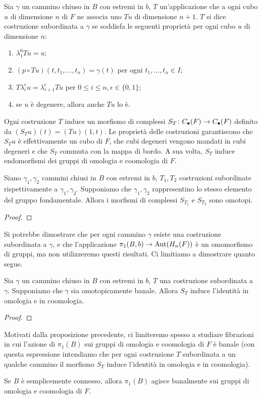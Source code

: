 \begin{definition}
Sia $\gamma$ un cammino chiuso in $B$ con estremi in $b$, $T$ un'applicazione che a ogni cubo $u$ di dimensione $n$ di $F$ ne associa uno $Tu$ di dimensione $n+1$. $T$ si dice costruzione subordinata a $\gamma$ se soddisfa le seguenti proprietà per ogni cubo $u$ di dimensione $n$:
\begin{enumerate}
\item $\lambda^0_1 Tu=u$;
\item $(p\circ Tu)(t,t_1,\ldots,t_n)=\gamma(t)$ per ogni $t_1,\ldots,t_n\in I$;
\item $T\lambda^\epsilon_iu=\lambda^\epsilon_{i+1}Tu$ per $0\le i\le n,\epsilon\in\{0,1\}$;
\item se $u$ è degenere, allora anche $Tu$ lo è.
\end{enumerate}
\end{definition}
Ogni costruzione $T$ induce un morfismo di complessi $S_T\colon C_\bullet(F)\to C_\bullet(F)$ definito da $(S_Tu)(t)=(Tu)(1,t)$. Le proprietà delle costruzioni garantiscono che $S_Tu$ è effettivamente un cubo di $F$, che cubi degeneri vengono mandati in cubi degeneri e che $S_T$ commuta con la mappa di bordo. A sua volta, $S_T$ induce endomorfismi dei gruppi di omologia e coomologia di $F$.
\begin{proposition}
Siano $\gamma_1,\gamma_2$ cammini chiusi in $B$ con estremi in $b$, $T_1,T_2$ costruzioni subordinate rispettivamente a $\gamma_1,\gamma_2$. Supponiamo che $\gamma_1,\gamma_2$ rappresentino lo stesso elemento del gruppo fondamentale. Allora i morfismi di complessi $S_{T_1}$ e $S_{T_2}$ sono omotopi.
\end{proposition}
\begin{proof}

\end{proof}
Si potrebbe dimostrare che per ogni cammino $\gamma$ esiste una costruzione subordinata a $\gamma$, e che l'applicazione $\pi_1(B,b)\to\operatorname{Aut}(H_n(F))$ è un omomorfismo di gruppi, ma non utilizzeremo questi risultati. 
Ci limitiamo a dimostrare quanto segue.
\begin{proposition}
Sia $\gamma$ un cammino chiuso in $B$ con estremi in $b$, $T$ una costruzione subordinata a $\gamma$. Supponiamo che $\gamma$ sia omotopicamente banale. Allora $S_T$ induce l'identità in omologia e in coomologia.
\end{proposition}
\begin{proof}

\end{proof}
Motivati dalla proposizione precedente, ci limiteremo spesso a studiare fibrazioni in cui l'azione di $\pi_1(B)$ sui gruppi di omologia e coomologia di $F$ è banale (con questa espressione intendiamo che per ogni costruzione $T$ subordinata a un qualche cammino il morfismo $S_T$ induce l'identità in omologia e in coomologia).
\begin{corollary}
Se $B$ è semplicemente connesso, allora $\pi_1(B)$ agisce banalmente sui gruppi di omologia e coomologia di $F$.
\end{corollary}

